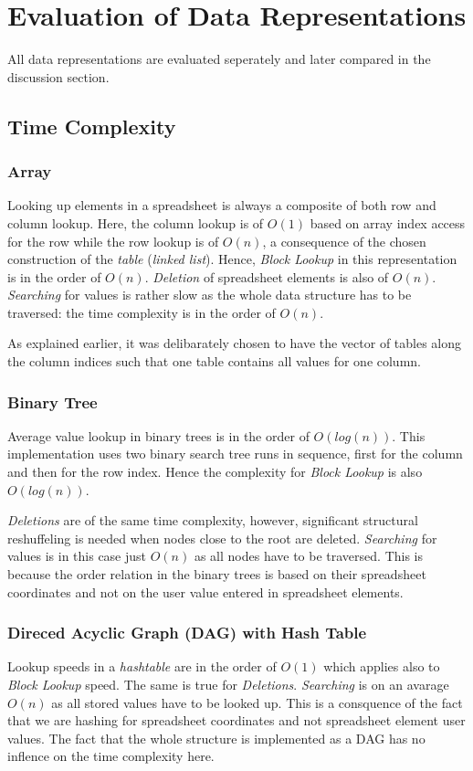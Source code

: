 \documentclass[a4paper,11pt,twoside]{article}
\begin{document}
\section{Evaluation of Data Representations}
All data representations are evaluated seperately and later compared
in the discussion section.
\subsection{Time Complexity}
\subsubsection{Array}
Looking up elements in a spreadsheet is always a composite of both row
and column lookup. Here, the column lookup is of $O(1)$ based on array
index access for the row while the row lookup is of $O(n)$, a
consequence of the chosen construction of the \textit{table}
(\textit{linked list}). Hence, \emph{Block Lookup} in this representation
is in the order of $O(n)$. \emph{Deletion} of spreadsheet elements is
also of $O(n)$. \emph{Searching} for values is rather slow as the whole
data structure has to be traversed: the time complexity is in the
order of $O(n)$.

As explained earlier, it was delibarately chosen to have the vector of tables
along the column indices such that one table contains all values for
one column.

\subsubsection{Binary Tree}
Average value lookup in binary trees is in the order of
$O(log(n))$. This implementation uses two binary search tree runs in
sequence, first for the column and then for the row index. Hence the
complexity for \emph{Block Lookup} is also $O(log(n))$.

\emph{Deletions} are of the same time complexity, however, significant 
structural reshuffeling is needed when nodes close to the root are deleted. 
\emph{Searching} for values is in this case just $O(n)$ as all
nodes have to be traversed. This is because the order relation in the
binary trees is based on their spreadsheet coordinates and not on the user
value entered in spreadsheet elements.




\subsubsection{Direced Acyclic Graph (DAG) with Hash Table}
Lookup speeds in a \textit{hashtable} are in the order of $O(1)$ which
applies also to \emph{Block Lookup} speed. The same is true for
\emph{Deletions}. \emph{Searching} is on an avarage $O(n)$ as all stored values
have to be looked up. This is a consquence of the fact that we are
hashing for spreadsheet coordinates and not spreadsheet element user
values. The fact that the whole structure is implemented as a DAG has
no inflence on the time complexity here. 
\end{document}
